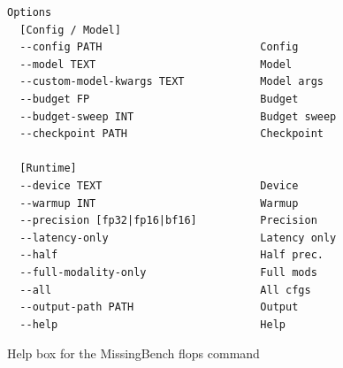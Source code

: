 \documentclass{article}
\begin{document}
\begin{figure}[h]
\centering
\begin{tcolorbox}[
  colback=lightgreenbg,
  colframe=lightgreenframe,
  arc=2mm,
  boxrule=0.6pt,
  title=MissingBench flops,
  fonttitle=\bfseries
]
\begin{Verbatim}[breaklines=true,breakanywhere=true,fontsize=\small]
Options
  [Config / Model]
  --config PATH                         Config
  --model TEXT                          Model
  --custom-model-kwargs TEXT            Model args
  --budget FP                           Budget
  --budget-sweep INT                    Budget sweep
  --checkpoint PATH                     Checkpoint

  [Runtime]
  --device TEXT                         Device
  --warmup INT                          Warmup
  --precision [fp32|fp16|bf16]          Precision
  --latency-only                        Latency only
  --half                                Half prec.
  --full-modality-only                  Full mods
  --all                                 All cfgs
  --output-path PATH                    Output
  --help                                Help
\end{Verbatim}
\end{tcolorbox}
\caption{Help box for the MissingBench flops command}
\label{fig:missingbench_flops}
\end{figure}
\end{document}
